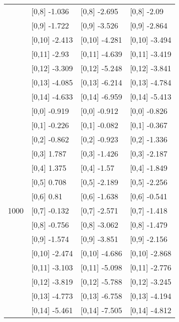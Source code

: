\begin{table}
\begin{tabular}[t]{llll}
 & {}[0,8] -1.036 & {}[0,8] -2.695 & {}[0,8] -2.09\\
 & {}[0,9] -1.722 & {}[0,9] -3.526 & {}[0,9] -2.864\\
\addlinespace
 & {}[0,10] -2.413 & {}[0,10] -4.281 & {}[0,10] -3.494\\
 & {}[0,11] -2.93 & {}[0,11] -4.639 & {}[0,11] -3.419\\
 & {}[0,12] -3.309 & {}[0,12] -5.248 & {}[0,12] -3.841\\
 & {}[0,13] -4.085 & {}[0,13] -6.214 & {}[0,13] -4.784\\
 & {}[0,14] -4.633 & {}[0,14] -6.959 & {}[0,14] -5.413\\
\addlinespace
 & {}[0,0] -0.919 & {}[0,0] -0.912 & {}[0,0] -0.826\\
 & {}[0,1] -0.226 & {}[0,1] -0.082 & {}[0,1] -0.367\\
 & {}[0,2] -0.862 & {}[0,2] -0.923 & {}[0,2] -1.336\\
 & {}[0,3] 1.787 & {}[0,3] -1.426 & {}[0,3] -2.187\\
 & {}[0,4] 1.375 & {}[0,4] -1.57 & {}[0,4] -1.849\\
\addlinespace
 & {}[0,5] 0.708 & {}[0,5] -2.189 & {}[0,5] -2.256\\
 & {}[0,6] 0.81 & {}[0,6] -1.638 & {}[0,6] -0.541\\
1000 & {}[0,7] -0.132 & {}[0,7] -2.571 & {}[0,7] -1.418\\
 & {}[0,8] -0.756 & {}[0,8] -3.062 & {}[0,8] -1.479\\
 & {}[0,9] -1.574 & {}[0,9] -3.851 & {}[0,9] -2.156\\
\addlinespace
 & {}[0,10] -2.474 & {}[0,10] -4.686 & {}[0,10] -2.868\\
 & {}[0,11] -3.103 & {}[0,11] -5.098 & {}[0,11] -2.776\\
 & {}[0,12] -3.819 & {}[0,12] -5.788 & {}[0,12] -3.245\\
 & {}[0,13] -4.773 & {}[0,13] -6.758 & {}[0,13] -4.194\\
 & {}[0,14] -5.461 & {}[0,14] -7.505 & {}[0,14] -4.812\\
\bottomrule
\end{tabular}
\end{table}
